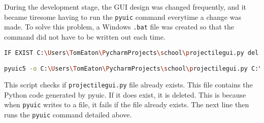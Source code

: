 During the development stage, the GUI design was changed frequently, and it became tiresome having to run the \texttt{pyuic} command everytime a change was made. To solve this problem, a Windows \texttt{.bat} file was created so that the command did not have to be written out each time. 
\begin{lstlisting}[language=bash, caption=Batch script to update Python code]
IF EXIST C:\Users\TomEaton\PycharmProjects\school\projectilegui.py del /F C:\Users\TomEaton\PycharmProjects\school\projectilegui.py 

pyuic5 -o C:\Users\TomEaton\PycharmProjects\school\projectilegui.py C:\Users\TomEaton\Documents\suvat\suvat.ui
\end{lstlisting}
This script checks if \texttt{projectilegui.py} file already exists. This file contains the Python code generated by pyuic. If it does exist, it is deleted. This is because when \texttt{pyuic} writes to a file, it fails if the file already exists. The next line then runs the \texttt{pyuic} command detailed above.